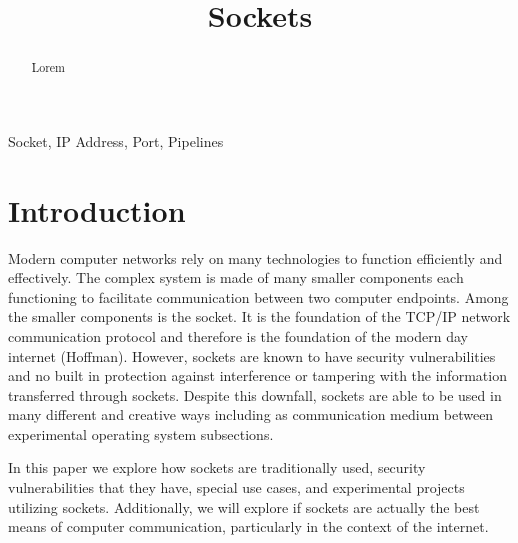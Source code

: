 \documentclass[conference, 12pt]{IEEEtran}
\begin{document}
\title{Sockets}

\author{
\and
{}
\and
{}
}

\maketitle

\begin{abstract}
Lorem
\end{abstract}

\begin{IEEEkeywords}
Socket, IP Address, Port, Pipelines
\end{IEEEkeywords}

\section{Introduction}
Modern computer networks rely on many technologies to function efficiently and effectively. The complex system is made of many smaller components each functioning to facilitate communication between two computer endpoints. Among the smaller components is the socket. It is the foundation of the TCP/IP network communication protocol and therefore is the foundation of the modern day internet (Hoffman). However, sockets are known to have security vulnerabilities and no built in protection against interference or tampering with the information transferred through sockets. Despite this downfall, sockets are able to be used in many different and creative ways including as communication medium between experimental operating system subsections.

In this paper we explore how sockets are traditionally used, security vulnerabilities that they have, special use cases, and experimental projects utilizing sockets. Additionally, we will explore if sockets are actually the best means of computer communication, particularly in the context of the internet.
\end{document}
